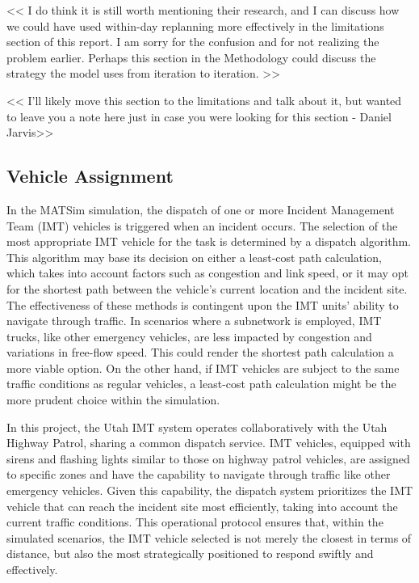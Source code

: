 \documentclass[fancy, oneside, mastersfancy, ms]{byuthesis}
\begin{document}
\textless\textless{} I do think it is still worth mentioning their
research, and I can discuss how we could have used within-day replanning
more effectively in the limitations section of this report. I am sorry
for the confusion and for not realizing the problem earlier. Perhaps
this section in the Methodology could discuss the strategy the model
uses from iteration to iteration. \textgreater\textgreater{}

\textless\textless{} I'll likely move this section to the limitations
and talk about it, but wanted to leave you a note here just in case you
were looking for this section - Daniel Jarvis\textgreater\textgreater{}

\hypertarget{vehicle-assignment}{%
\subsection{Vehicle Assignment}\label{vehicle-assignment}}

In the MATSim simulation, the dispatch of one or more Incident
Management Team (IMT) vehicles is triggered when an incident occurs. The
selection of the most appropriate IMT vehicle for the task is determined
by a dispatch algorithm. This algorithm may base its decision on either
a least-cost path calculation, which takes into account factors such as
congestion and link speed, or it may opt for the shortest path between
the vehicle's current location and the incident site. The effectiveness
of these methods is contingent upon the IMT units' ability to navigate
through traffic. In scenarios where a subnetwork is employed, IMT
trucks, like other emergency vehicles, are less impacted by congestion
and variations in free-flow speed. This could render the shortest path
calculation a more viable option. On the other hand, if IMT vehicles are
subject to the same traffic conditions as regular vehicles, a least-cost
path calculation might be the more prudent choice within the simulation.

In this project, the Utah IMT system operates collaboratively with the
Utah Highway Patrol, sharing a common dispatch service. IMT vehicles,
equipped with sirens and flashing lights similar to those on highway
patrol vehicles, are assigned to specific zones and have the capability
to navigate through traffic like other emergency vehicles. Given this
capability, the dispatch system prioritizes the IMT vehicle that can
reach the incident site most efficiently, taking into account the
current traffic conditions. This operational protocol ensures that,
within the simulated scenarios, the IMT vehicle selected is not merely
the closest in terms of distance, but also the most strategically
positioned to respond swiftly and effectively.
\end{document}
